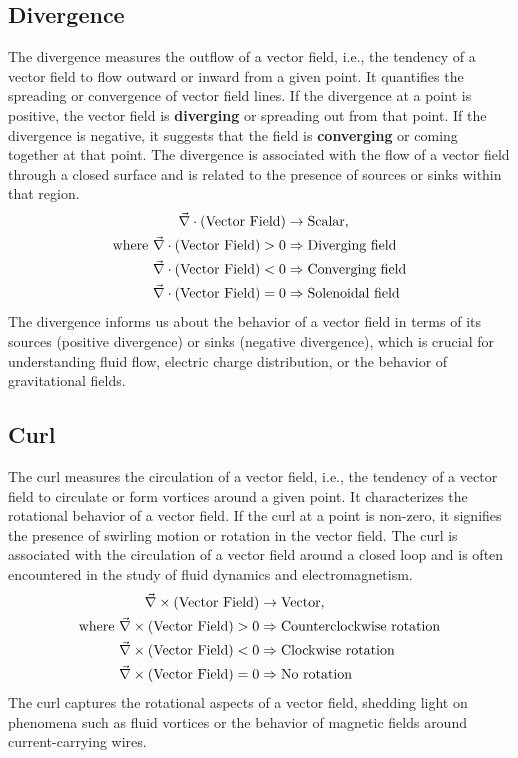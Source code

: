 \documentclass[12pt,b4paper]{article}
\begin{document}
\subsection*{Divergence} The divergence measures the outflow of a vector field, i.e., the tendency of a vector field to flow outward or inward from a given point. It quantifies the spreading or convergence of vector field lines. If the divergence at a point is positive, the vector field is \textbf{diverging} or spreading out from that point. If the divergence is negative, it suggests that the field is \textbf{converging} or coming together at that point. The divergence is associated with the flow of a vector field through a closed surface and is related to the presence of sources or sinks within that region.
\begin{align}
    \Vec{\nabla}\cdot\left(\text{Vector Field}\right)&\to\text{Scalar},\\
    \text{where }\Vec{\nabla}\cdot\left(\text{Vector Field}\right)>0&\Rightarrow\text{Diverging field}\notag\\
    \Vec{\nabla}\cdot\left(\text{Vector Field}\right)<0&\Rightarrow\text{Converging field}\notag\\
    \Vec{\nabla}\cdot\left(\text{Vector Field}\right)=0&\Rightarrow\text{Solenoidal field}\notag
\end{align}
The divergence informs us about the behavior of a vector field in terms of its sources (positive divergence) or sinks (negative divergence), which is crucial for understanding fluid flow, electric charge distribution, or the behavior of gravitational fields. 
\subsection*{Curl} The curl measures the circulation of a vector field, i.e., the tendency of a vector field to circulate or form vortices around a given point. It characterizes the rotational behavior of a vector field. If the curl at a point is non-zero, it signifies the presence of swirling motion or rotation in the vector field. The curl is associated with the circulation of a vector field around a closed loop and is often encountered in the study of fluid dynamics and electromagnetism.
\begin{align}
    \Vec{\nabla}\times\left(\text{Vector Field}\right)&\to\text{Vector},\\
    \text{where }\Vec{\nabla}\times\left(\text{Vector Field}\right)>0&\Rightarrow\text{Counterclockwise rotation}\notag\\
    \Vec{\nabla}\times\left(\text{Vector Field}\right)<0&\Rightarrow\text{Clockwise rotation}\notag\\
    \Vec{\nabla}\times\left(\text{Vector Field}\right)=0&\Rightarrow\text{No rotation}\notag
\end{align}
The curl captures the rotational aspects of a vector field, shedding light on phenomena such as fluid vortices or the behavior of magnetic fields around current-carrying wires.
\end{document}
